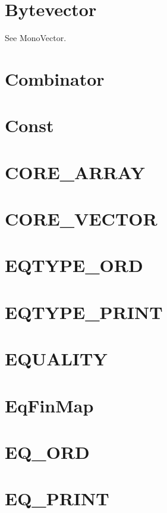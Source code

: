 \section{Bytevector}
See MonoVector.

\newpage
\section{Combinator}


\newpage
\section{Const}


\newpage
\section{CORE\_ARRAY}


\newpage
\section{CORE\_VECTOR}


\newpage
\section{EQTYPE\_ORD}


\newpage
\section{EQTYPE\_PRINT}


\newpage
\section{EQUALITY}


\newpage
\section{EqFinMap}


\newpage
\section{EQ\_ORD}


\newpage
\section{EQ\_PRINT}


